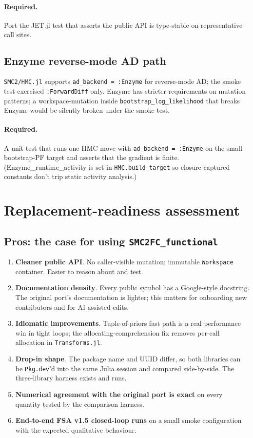 \documentclass[11pt,a4paper]{article}
\begin{document}
\paragraph{Required.} Port the JET.jl test that asserts the public API
is type-stable on representative call sites.

\subsection{Enzyme reverse-mode AD path}
\texttt{SMC2/HMC.jl} supports \texttt{ad\_backend = :Enzyme} for
reverse-mode AD; the smoke test exercised \texttt{:ForwardDiff} only.
Enzyme has stricter requirements on mutation patterns; a workspace-mutation
inside \texttt{bootstrap\_log\_likelihood} that breaks Enzyme would be
silently broken under the smoke test.

\paragraph{Required.} A unit test that runs one HMC move with
\texttt{ad\_backend = :Enzyme} on the small bootstrap-PF target and
asserts that the gradient is finite. (Enzyme\_runtime\_activity is set in
\texttt{HMC.build\_target} so closure-captured constants don't trip
static activity analysis.)

\section{Replacement-readiness assessment}

\subsection{Pros: the case for using \texttt{SMC2FC\_functional}}
\begin{enumerate}[leftmargin=*]
\item \textbf{Cleaner public API}. No caller-visible mutation; immutable
\texttt{Workspace} container. Easier to reason about and test.
\item \textbf{Documentation density}. Every public symbol has a
Google-style docstring. The original port's documentation is lighter;
this matters for onboarding new contributors and for AI-assisted edits.
\item \textbf{Idiomatic improvements}. Tuple-of-priors fast path is a
real performance win in tight loops; the allocating-comprehension fix
removes per-call allocation in \texttt{Transforms.jl}.
\item \textbf{Drop-in shape}. The package name and UUID differ, so both
libraries can be \texttt{Pkg.dev}'d into the same Julia session and
compared side-by-side. The three-library harness exists and runs.
\item \textbf{Numerical agreement with the original port is exact} on
every quantity tested by the comparison harness.
\item \textbf{End-to-end FSA v1.5 closed-loop runs} on a small smoke
configuration with the expected qualitative behaviour.
\end{enumerate}
\end{document}
